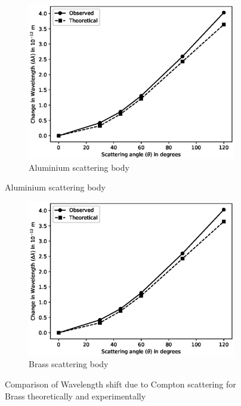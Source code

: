 \begin{figure}[H]
    \begin{subfigure}{\linewidth}
        \centering
        \includegraphics[width=1\columnwidth]{images/al.eps}
        \caption{Aluminium scattering body}
    \end{subfigure}
\end{figure}
\begin{figure}[H]
    \ContinuedFloat
    \begin{subfigure}{\linewidth}
        \centering
        \includegraphics[width=1\columnwidth]{images/al.eps}
        \caption{Brass scattering body}
    \end{subfigure}
    \caption{Comparison of Wavelength shift due to Compton scattering for Brass theoretically and experimentally}
    \label{plot3}
\end{figure}

